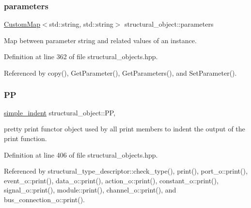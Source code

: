\mbox{\label{classstructural__object_ab665280607e11d5ae406f1760ebc9881}} 
\subsubsection{\texorpdfstring{parameters}{parameters}}
{\footnotesize\ttfamily \hyperlink{custom__map_8hpp_a18ca01763abbe3e5623223bfe5aaac6b}{Custom\+Map}$<$std\+::string, std\+::string$>$ structural\+\_\+object\+::parameters\hspace{0.3cm}{\ttfamily [private]}}



Map between parameter string and related values of an instance. 



Definition at line 362 of file structural\+\_\+objects.\+hpp.



Referenced by copy(), Get\+Parameter(), Get\+Parameters(), and Set\+Parameter().

\mbox{\label{classstructural__object_ae310104d0f3515966905919d32a08efa}} 
\subsubsection{\texorpdfstring{PP}{PP}}
{\footnotesize\ttfamily \hyperlink{classsimple__indent}{simple\+\_\+indent} structural\+\_\+object\+::\+PP\hspace{0.3cm}{\ttfamily [static]}, {\ttfamily [protected]}}



pretty print functor object used by all print members to indent the output of the print function. 



Definition at line 406 of file structural\+\_\+objects.\+hpp.



Referenced by structural\+\_\+type\+\_\+descriptor\+::check\+\_\+type(), print(), port\+\_\+o\+::print(), event\+\_\+o\+::print(), data\+\_\+o\+::print(), action\+\_\+o\+::print(), constant\+\_\+o\+::print(), signal\+\_\+o\+::print(), module\+::print(), channel\+\_\+o\+::print(), and bus\+\_\+connection\+\_\+o\+::print().

